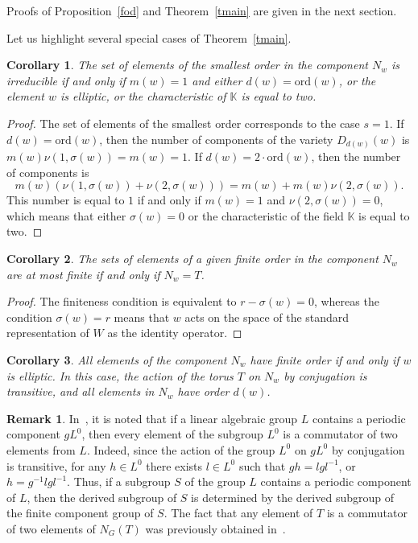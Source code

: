 \documentclass[a4paper,12pt]{amsart}
\theoremstyle{plain}
\newtheorem{corollary}{Corollary}
\theoremstyle{definition}
\newtheorem{remark}{Remark}
\newcommand{\KK}{\mathbb{K}}
\newcommand{\ord}{\mathrm{ord}}
\begin{document}
\noindent Proofs of Proposition~\ref{fod} and Theorem~\ref{tmain} are given in the next section.

\medskip

Let us highlight several special cases of Theorem~\ref{tmain}.

\begin{corollary}
The set of elements of the smallest order in the component $N_w$ is irreducible if and only if $m(w)=1$ and either $d(w)=\ord(w)$, or the element $w$ is elliptic, or the characteristic of $\KK$ is equal to two.
\end{corollary}

\begin{proof}
The set of elements of the smallest order corresponds to the case $s=1$. If $d(w)=\ord(w)$, then the number of components of the variety $D_{d(w)}(w)$ is $m(w)\nu(1,\sigma(w))=m(w)=1$. If $d(w)=2\cdot\ord(w)$, then the number of components is
$$
m(w)(\nu(1,\sigma(w))+\nu(2,\sigma(w)))=m(w)+m(w)\nu(2,\sigma(w)).
$$
This number is equal to $1$ if and only if $m(w)=1$ and $\nu(2,\sigma(w))=0$, which means that either $\sigma(w)=0$ or the characteristic of the field $\KK$ is equal to two.
\end{proof}

\begin{corollary}
The sets of elements of a given finite order in the component $N_w$ are at most finite if and only if $N_w=T$.
\end{corollary}

\begin{proof}
The finiteness condition is equivalent to $r-\sigma(w)=0$, whereas the condition ${\sigma(w)=r}$ means that $w$ acts on the space of the standard representation of $W$ as the identity operator.
\end{proof}

\begin{corollary}
All elements of the component $N_w$ have finite order if and only if $w$ is elliptic. In this case, the action of the torus $T$ on $N_w$ by conjugation is transitive, and all elements in $N_w$ have order $d(w)$.
\end{corollary}

\begin{remark}\label{rem2}
In~\cite[Corollary~2]{Fe}, it is noted that if a linear algebraic group $L$ contains a periodic component $gL^0$, then every element of the subgroup $L^0$ is a commutator of two elements from $L$. Indeed, since the action of the group $L^0$ on $gL^0$ by conjugation is transitive, for any $h\in L^0$ there exists $l\in L^0$ such that $gh=lgl^{-1}$, or $h=g^{-1}lgl^{-1}$. Thus, if a subgroup $S$ of the group $L$ contains a periodic component of $L$, then the derived subgroup of $S$ is determined by the derived subgroup of the finite component group of $S$. The fact that any element of $T$ is a commutator of two elements of $N_G(T)$ was previously obtained in~\cite[Lemma~2.3]{Re}.
\end{remark}
\end{document}
